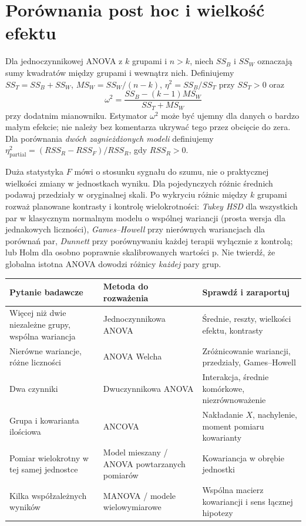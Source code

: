 \section{Porównania post hoc i wielkość efektu}
\begin{definicja}\label{def:anova-effectsize}
Dla jednoczynnikowej ANOVA z $k$ grupami i $n>k$, niech $SS_B$ i $SS_W$ oznaczają sumy kwadratów między grupami i wewnątrz nich. Definiujemy $SS_T=SS_B+SS_W$, $MS_W=SS_W/(n-k)$, $\eta^2=SS_B/SS_T$ przy $SS_T>0$ oraz
\[
 \omega^2=\frac{SS_B-(k-1)MS_W}{SS_T+MS_W}
\]
przy dodatnim mianowniku. Estymator $\omega^2$ może być ujemny dla danych o bardzo małym efekcie; nie należy bez komentarza ukrywać tego przez obcięcie do zera. Dla porównania \emph{dwóch zagnieżdżonych modeli} definiujemy $\eta_{\mathrm{partial}}^2=(RSS_R-RSS_F)/RSS_R$, gdy $RSS_R>0$.
\end{definicja}

\begin{uwaga}
Duża statystyka $F$ mówi o stosunku sygnału do szumu, nie o praktycznej wielkości zmiany w jednostkach wyniku. Dla pojedynczych różnic średnich podawaj przedziały w oryginalnej skali. Po wykryciu różnic między $k$ grupami rozważ planowane kontrasty i kontrolę wielokrotności: \emph{Tukey HSD} dla wszystkich par w klasycznym normalnym modelu o wspólnej wariancji (prosta wersja dla jednakowych liczności), \emph{Games--Howell} przy nierównych wariancjach dla porównań par, \emph{Dunnett} przy porównywaniu każdej terapii wyłącznie z kontrolą; lub Holm dla osobno poprawnie skalibrowanych wartości p. Nie twierdź, że globalna istotna ANOVA dowodzi różnicy \emph{każdej} pary grup.
\end{uwaga}

\begin{center}\small
\begin{tabular}{>{\raggedright\arraybackslash}p{}>{\raggedright\arraybackslash}p{}>{\raggedright\arraybackslash}p{}}
\toprule
\textbf{Pytanie badawcze} & \textbf{Metoda do rozważenia} & \textbf{Sprawdź i zaraportuj}\\
\midrule
Więcej niż dwie niezależne grupy, wspólna wariancja & Jednoczynnikowa ANOVA & Średnie, reszty, wielkości efektu, kontrasty\\
Nierówne wariancje, różne liczności & ANOVA Welcha & Zróżnicowanie wariancji, przedziały, Games--Howell\\
Dwa czynniki & Dwuczynnikowa ANOVA & Interakcja, średnie komórkowe, niezrównoważenie\\
Grupa i kowarianta ilościowa & ANCOVA & Nakładanie $X$, nachylenie, moment pomiaru kowarianty\\
Pomiar wielokrotny w tej samej jednostce & Model mieszany / ANOVA powtarzanych pomiarów & Kowariancja w obrębie jednostki\\
Kilka współzależnych wyników & MANOVA / modele wielowymiarowe & Wspólna macierz kowariancji i sens łącznej hipotezy\\
\bottomrule
\end{tabular}
\end{center}

